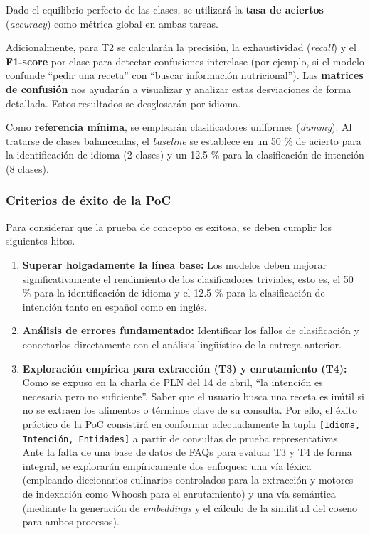 \documentclass[11pt,a4paper,twoside]{article}
\theoremstyle{definition}
\numberwithin{equation}{section}
\begin{document}
Dado el equilibrio perfecto de las clases, se utilizará la \textbf{tasa de aciertos} (\textit{accuracy}) como métrica global en ambas tareas. 

Adicionalmente, para T2 se calcularán la precisión, la exhaustividad (\textit{recall}) y el \textbf{F1-score} por clase para detectar confusiones interclase (por ejemplo, si el modelo confunde ``pedir una receta'' con ``buscar información nutricional''). Las \textbf{matrices de confusión} nos ayudarán a visualizar y analizar estas desviaciones de forma detallada. Estos resultados se desglosarán por idioma. 

Como \textbf{referencia mínima}, se emplearán clasificadores uniformes (\textit{dummy}). Al tratarse de clases balanceadas, el \textit{baseline} se establece en un 50 \% de acierto para la identificación de idioma (2 clases) y un 12.5 \% para la clasificación de intención (8 clases).

\subsubsection*{Criterios de éxito de la PoC}
Para considerar que la prueba de concepto es exitosa, se deben cumplir los siguientes hitos.
\begin{enumerate}
	\item \textbf{Superar holgadamente la línea base:} Los modelos deben mejorar significativamente el rendimiento de los clasificadores triviales, esto es, el 50 \% para la identificación de idioma y el 12.5 \% para la clasificación de intención tanto en español como en inglés. 
	\item \textbf{Análisis de errores fundamentado:} Identificar los fallos de clasificación y conectarlos directamente con el análisis lingüístico de la entrega anterior.
	\item \textbf{Exploración empírica para extracción (T3) y enrutamiento (T4):} Como se expuso en la charla de PLN del 14 de abril, ``la intención es necesaria pero no suficiente''. Saber que el usuario busca una receta es inútil si no se extraen los alimentos o términos clave de su consulta. Por ello, el éxito práctico de la PoC consistirá en conformar adecuadamente la tupla \texttt{[Idioma, Intención, Entidades]} a partir de consultas de prueba representativas. Ante la falta de una base de datos de FAQs para evaluar T3 y T4 de forma integral, se explorarán empíricamente dos enfoques: una vía léxica (empleando diccionarios culinarios controlados para la extracción y motores de indexación como Whoosh para el enrutamiento) y una vía semántica (mediante la generación de \textit{embeddings} y el cálculo de la similitud del coseno para ambos procesos).
\end{enumerate}
\end{document}
